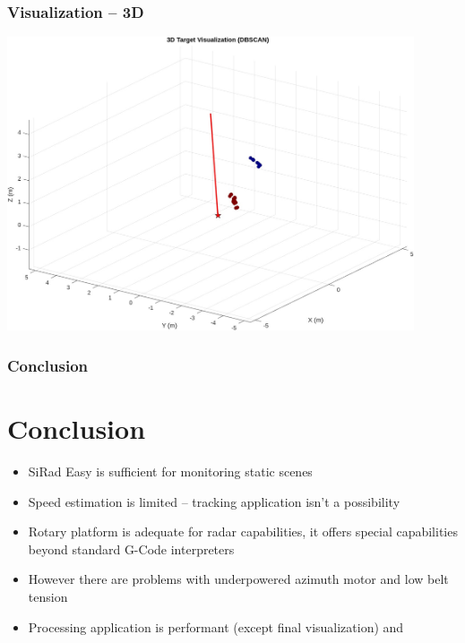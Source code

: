 \documentclass[aspectratio=43]{beamer}
\begin{document}
\begin{frame}[fragile]
  \frametitle{Visualization -- 3D}
	\begin{center}
  \includegraphics[width=0.9\textwidth]{../img/vis_3d.jpg}
	\end{center}
\end{frame}


\begin{frame}[fragile]
  \frametitle{Conclusion}
  \section{Conclusion}
  \begin{itemize}
    \item SiRad Easy is sufficient for monitoring static scenes
		\item Speed estimation is limited -- tracking application isn't a possibility
		\item Rotary platform is adequate for radar capabilities, it offers special capabilities beyond standard G-Code interpreters
		\item However there are problems with underpowered azimuth motor and low belt tension
		\item Processing application is performant (except final visualization) and
  \end{itemize}
\end{frame}
\end{document}
